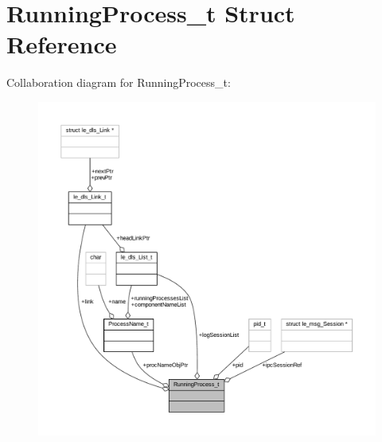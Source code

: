 \hypertarget{struct_running_process__t}{}\section{Running\+Process\+\_\+t Struct Reference}
\label{struct_running_process__t}


Collaboration diagram for Running\+Process\+\_\+t\+:
\nopagebreak
\begin{figure}[H]
\begin{center}
\leavevmode
\includegraphics[width=350pt]{struct_running_process__t__coll__graph}
\end{center}
\end{figure}
